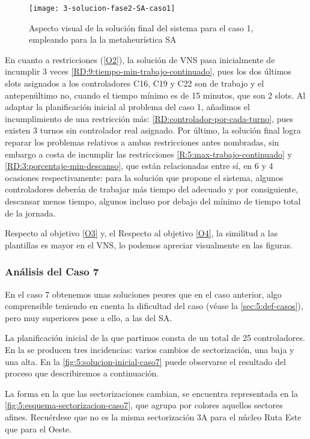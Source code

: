 \begin{figure}
	\centering
	\texttt{[image: 3-solucion-fase2-SA-caso1]}
	\caption{Aspecto visual de la solución final del sistema para el caso 1, empleando para la \fasedos{} la metaheurística SA}
	\label{fig:5:solucion-fase2-sa-caso1}
\end{figure}

En cuanto a restricciones (\ref{O2}), la solución de VNS pasa inicialmente de incumplir 3 veces \ref{RD:9:tiempo-min-trabajo-continuado}, pues los dos últimos slots asignados a los controladores C16, C19 y C22 son de trabajo y el antepenúltimo no, cuando el tiempo mínimo es de 15 minutos, que son 2 slots.
Al adaptar la planificación inicial al problema del caso 1, añadimos el incumplimiento de una restricción más: \ref{RD:controlador-por-cada-turno}, pues existen 3 turnos sin controlador real asignado.
Por último, la solución final logra reparar los problemas relativos a ambas restricciones antes nombradas, sin embargo a costa de incumplir las restricciones \ref{R:5:max-trabajo-continuado} y \ref{RD:3:porcentaje-min-descanso}, que están relacionadas entre sí, en 6 y 4 ocasiones respectivamente: para la solución que propone el sistema, algunos controladores deberán de trabajar más tiempo del adecuado y por consiguiente, descansar menos tiempo, algunos incluso por debajo del mínimo de tiempo total de la jornada.

Respecto al objetivo \ref{O3} y, el %
Respecto al objetivo \ref{O4}, la similitud a las plantillas es mayor en el VNS, lo podemos apreciar visualmente en las figuras.

\subsubsection{Análisis del Caso 7}

En el caso 7 obtenemos unas soluciones peores que en el caso anterior, algo comprensible teniendo en cuenta la dificultad del caso (véase la \autoref{sec:5:def-casos}), pero muy superiores pese a ello, a las del SA. 

La planificación inicial de la que partimos consta de un total de 25 controladores. 
En la \faseuno{} se producen tres incidencias: varios cambios de sectorización, una baja y una alta. En la \autoref{fig:5:solucion-inicial-caso7} puede observarse el resultado del proceso que describiremos a continuación.

La forma en la que las sectorizaciones cambian, se encuentra representada en la \autoref{fig:5:esquema-sectorizacion-caso7}, que agrupa por colores aquellos sectores afines. 
Recuérdese que no es la misma sectorización 3A para el núcleo Ruta Este que para el Oeste. 

